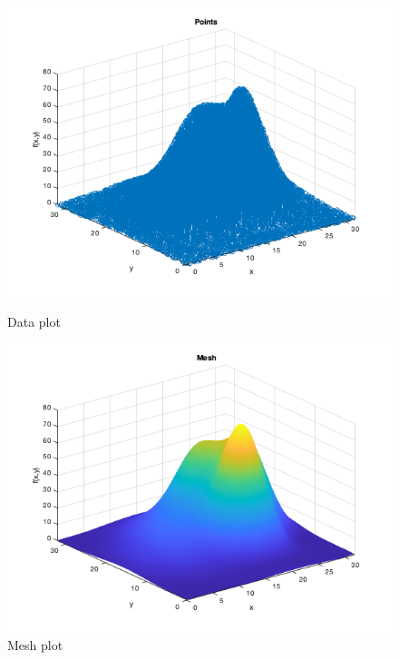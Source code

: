 \begin{figure}[h!]
    \centering
    \begin{minipage}{.5\textwidth}
        \centering
        \includegraphics[width=\linewidth]{figures/ex1_stem3.png}
        \caption{Data plot}
        \label{fig:figures/ex1_stem3.png}
    \end{minipage}%
    \begin{minipage}{.5\textwidth}
        \centering
        \includegraphics[width=\linewidth]{figures/ex1_mesh.png}
        \caption{Mesh plot}
        \label{fig:figures/ex1_mesh.png}
    \end{minipage}
\end{figure}

